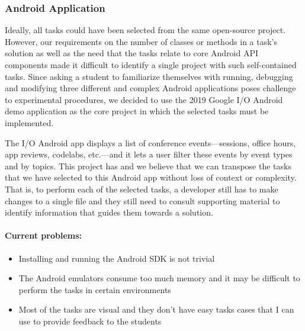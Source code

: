 \subsubsection{Android Application}


Ideally, all tasks could have been selected from the same open-source project. However, our requirements on the number of classes or methods in a task's solution as well as the need that the tasks relate to core Android API components made it difficult 
to identify a single project with such self-contained tasks. Since asking a student to familiarize themselves with running, debugging and modifying three different and complex Android applications 
poses challenge to experimental procedures, we decided to use the 2019 Google I/O Android demo application as the core project in which the selected tasks must be implemented. 


The I/O Android app displays a list of conference events---sessions, office hours, app reviews, codelabs, etc.---and it lets a user filter these events by event types and by topics.
This project has  and we believe that we can transpose the tasks that we have selected to this Android app without loss of context or complexity. 
That is, to perform each of the selected tasks, a developer still has to make changes to a single file and they still need to consult supporting material to identify information that guides them towards 
a solution.


\smallskip
\paragraph{\textbf{Current problems:}}

\begin{itemize}
    \item Installing and running the Android SDK is not trivial
    \item The Android emulators consume too much memory and it may be difficult to perform the tasks in certain environments
    \item Most of the tasks are visual and they don't have easy tasks cases that I can use to provide feedback to the students
\end{itemize}



